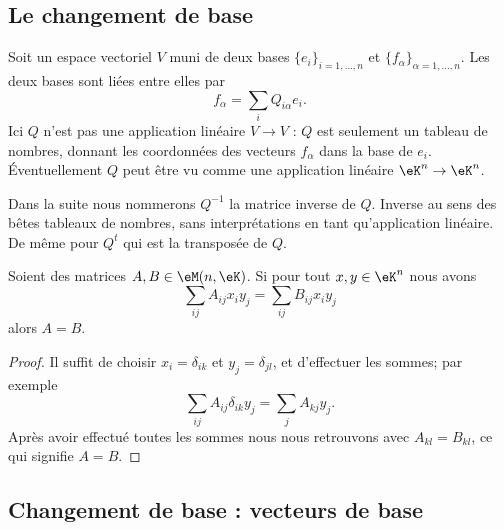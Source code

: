 \subsection{Le changement de base}

Soit un espace vectoriel \( V\) muni de deux bases \( \{ e_i\}_{i=1,\ldots, n}\) et \( \{ f_{\alpha}\}_{\alpha=1,\ldots, n}\). Les deux bases sont liées entre elles par
\begin{equation}        \label{EQooFRQRooSMsQQB}
    f_{\alpha}=\sum_iQ_{i\alpha}e_i.
\end{equation}
Ici \( Q\) n'est pas une application linéaire \( V\to V\) : \( Q\) est seulement un tableau de nombres, donnant les coordonnées des vecteurs \( f_{\alpha}\) dans la base de \( e_i\). Éventuellement \( Q\) peut être vu comme une application linéaire \( \eK^n\to \eK^n\).

Dans la suite nous nommerons \( Q^{-1}\) la matrice inverse de \( Q\). Inverse au sens des bêtes tableaux de nombres, sans interprétations en tant qu'application linéaire. De même pour \( Q^t\) qui est la transposée de \( Q\).

\begin{lemma}       \label{LEMooLXAHooPRyHaF}
    Soient des matrices \( A,B\in \eM(n,\eK)\). Si pour tout \( x,y\in \eK^n\) nous avons
    \begin{equation}
        \sum_{ij}A_{ij}x_iy_j=\sum_{ij}B_{ij}x_iy_j
    \end{equation}
    alors \( A=B\).
\end{lemma}

\begin{proof}
    Il suffit de choisir \( x_i=\delta_{ik}\) et \( y_j=\delta_{jl}\), et d'effectuer les sommes; par exemple
    \begin{equation}
        \sum_{ij}A_{ij}\delta_{ik}y_j=\sum_jA_{kj}y_j.
    \end{equation}
    Après avoir effectué toutes les sommes nous nous retrouvons avec \( A_{kl}=B_{kl}\), ce qui signifie \( A=B\).
\end{proof}

\subsection{Changement de base : vecteurs de base}

